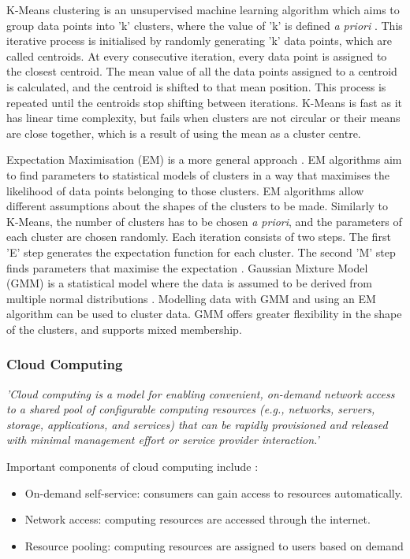\documentclass{article}
\begin{document}
\bigskip
\noindent K-Means clustering is an unsupervised machine learning algorithm which aims to group data points into 'k' clusters, where the value of 'k' is defined \textit{a priori} \cite{k_means}. This iterative process is initialised by randomly generating 'k' data points, which are called centroids. At every consecutive iteration, every data point is assigned to the closest centroid. The mean value of all the data points assigned to a centroid is calculated, and the centroid is shifted to that mean position. This process is repeated until the centroids stop shifting between iterations. K-Means is fast as it has linear time complexity, but fails when clusters are not circular or their means are close together, which is a result of using the mean as a cluster centre.

\bigskip
\noindent Expectation Maximisation (EM) is a more general approach \cite{k_means}. EM algorithms aim to find parameters to statistical models of clusters in a way that maximises the likelihood of data points belonging to those clusters. EM algorithms allow different assumptions about the shapes of the clusters to be made. Similarly to K-Means, the number of clusters has to be chosen \textit{a priori}, and the parameters of each cluster are chosen randomly. Each iteration consists of two steps. The first 'E' step generates the expectation function for each cluster. The second 'M' step finds parameters that maximise the expectation \cite{expectation_maximisation}. Gaussian Mixture Model (GMM) is a statistical model where the data is assumed to be derived from multiple normal distributions \cite{gmm}. Modelling data with GMM and using an EM algorithm can be used to cluster data. GMM offers greater flexibility in the shape of the clusters, and supports mixed membership. 

\subsubsection{Cloud Computing}
\textit{'Cloud computing is a model for enabling convenient, on-demand network access to a shared pool of configurable computing resources (e.g., networks, servers, storage, applications, and services) that can be rapidly provisioned and released with minimal management effort or service provider interaction.'} \cite{cloud_computing}
\bigskip

\noindent Important components of cloud computing include \cite{cloud_computing}:

\begin{itemize}
    \item On-demand self-service: consumers can gain access to resources automatically.
    \item Network access: computing resources are accessed through the internet.
    \item Resource pooling: computing resources are assigned to users based on demand
\end{itemize}
\end{document}
